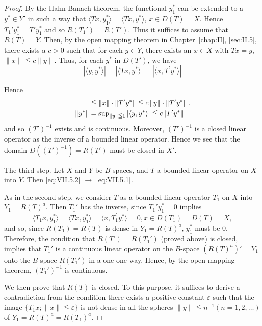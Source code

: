 \begin{proof}
By the Hahn-Banach theorem, the functional $y_1^*$ can be extended to a $y^* \in Y'$ in such a way that $\langle Tx, y_1^* \rangle = \langle Tx, y^* \rangle$, $x \in D(T) = X$. Hence $T_1' y_1^* = T' y_1^*$ and so $R(T_1') = R(T')$. Thus it suffices to assume that $R(T) = Y$. Then, by the open mapping theorem in Chapter~\ref{chap:II}, \ref{sec:II.5}, there exists a $c > 0$ such that for each $y \in Y$, there exists an $x \in X$ with $Tx = y$, $\|x\| \leqq c \|y\|$. Thus, for each $y^*$ in $D(T')$, we have 
\[
| \langle y, y ^{*} \rangle | = | \langle T x, y ^{*} \rangle | = | \langle x, T ^{\prime} y ^{*} \rangle |
\]

Hence 
\begin{align}
&\leqq \left\| x \right\| \cdot \left\| T ^{\prime} y ^{*} \right\| \leqq c \left\| y \right\| \cdot \left\| T ^{\prime} y ^{*} \right\|. \notag \\
\left\| y ^{*} \right\|& = \sup\limits _{\left\| y \right\| \leqq 1} | \langle y, y ^{*} \rangle | \leqq c \| T ^{\prime} y ^{*} \| \notag
\end{align}
and so $(T')^{-1}$ exists and is continuous. Moreover, $(T')^{-1}$ is a closed linear operator as the inverse of a bounded linear operator. Hence we see that the domain $D((T')^{-1}) = R(T')$ must be closed in $X'$. 

The third step. Let $X$ and $Y$ be $B$-spaces, and $T$ a bounded linear operator on $X$ into $Y$. Then \eqref{eq:VII.5.2} $\to$ \eqref{eq:VII.5.1}. 

As in the second step, we consider $T$ as a bounded linear operator $T_{1}$ on $X$ into $Y_{1} = R(T)^{a}$. Then $T_{1}'$ has the inverse, since $T_{1}'y_{1}^{*} = 0$ implies 
\[
\langle T _{1} x, y _{1} ^{*} \rangle = \langle T x, y _{1} ^{*} \rangle = \langle x, T _{1} ^{\prime} y _{1} ^{*} \rangle = 0, x \in D (T _{1}) = D (T) = X,
\]
and so, since $R(T_1) = R(T)$ is dense in $Y_1 = R(T)^a$, $y_1^*$ must be $0$. Therefore, the condition that $R(T') = R(T_1')$ (proved above) is closed, implies that $T_1'$ is a continuous linear operator on the $B$-space $(R(T)^a)' = Y_1$ onto the $B$-space $R(T_1')$ in a one-one way. Hence, by the open mapping theorem, $(T_1')^{-1}$ is continuous. 

We then prove that $R(T)$ is closed. To this purpose, it suffices to derive a contradiction from the condition 
there exists a positive constant $\varepsilon$ such that the image $\{T _{1} x; \| x \| \leqq \varepsilon \}$ is not dense in all the spheres $\| y \| \leqq n ^{-1}   (n = 1, 2, \dots)$ of $Y _{1} = R (T) ^{a} = R (T _{1}) ^{a}.$



\end{proof}
